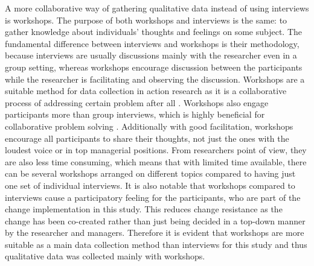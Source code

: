 A more collaborative way of gathering qualitative data instead of using interviews is workshops. The purpose of both workshops and interviews is the same: to gather
knowledge about individuals' thoughts and feelings on some subject. The fundamental difference between interviews and workshops is their methodology, because interviews
are usually discussions mainly with the researcher even in a group setting, whereas workshops encourage discussion between the participants while the researcher
is facilitating and observing the discussion. Workshops are a suitable method for data collection in action research as it is a collaborative process of
addressing certain problem after all \citep{Luscher2008}. Workshops also engage participants more than group interviews, which is highly beneficial for collaborative
problem solving \citep{Coghlan2011}\citep{Leondelabarra1997}\citep{Tsoukas2009}.
Additionally with good facilitation, workshops encourage all participants to share their thoughts, not just the
ones with the loudest voice or in top managerial positions. From researchers point of view, they are also less time consuming, which means that with limited time available,
there can be several workshops arranged on different topics compared to having just one set of individual interviews.
It is also notable that workshops compared to interviews cause a participatory feeling for the participants, who are part of the change implementation in this study. This reduces
change resistance as the change has been co-created rather than just being decided in a top-down manner by the researcher and managers. Therefore it is evident that workshops
are more suitable as a main data collection method than interviews for this study and thus qualitative data was collected mainly with workshops.

